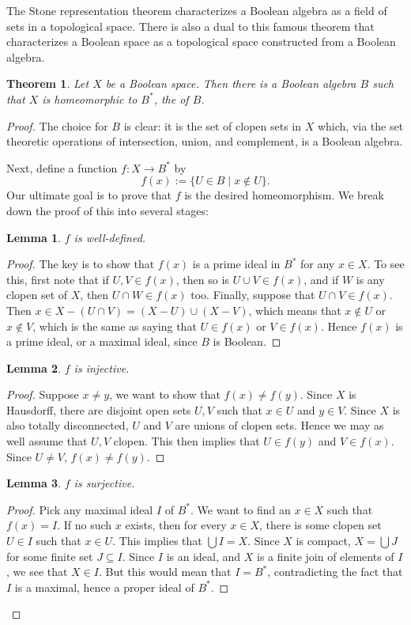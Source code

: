 \documentclass[12pt]{article}
\newtheorem{thm}{Theorem}
\newtheorem{lem}{Lemma}
\begin{document}
The Stone representation theorem characterizes a Boolean algebra as a field of sets in a topological space.  There is also a dual to this famous theorem that characterizes a Boolean space as a topological space constructed from a Boolean algebra.

\begin{thm} Let $X$ be a Boolean space.  Then there is a Boolean algebra $B$ such that $X$ is homeomorphic to $B^*$, the  of $B$. \end{thm}

\begin{proof}
The choice for $B$ is clear: it is the set of clopen sets in $X$ which, via the set theoretic operations of intersection, union, and complement, is a Boolean algebra.  

Next, define a function $f:X \to B^*$ by $$f(x):=\lbrace U \in B \mid x\notin U\rbrace.$$
Our ultimate goal is to prove that $f$ is the desired homeomorphism.  We break down the proof of this into several stages:

\begin{lem} $f$ is well-defined. \end{lem}
\begin{proof} The key is to show that $f(x)$ is a prime ideal in $B^*$ for any $x\in X$.  To see this, first note that if $U,V\in f(x)$, then so is $U\cup V \in f(x)$, and if $W$ is any clopen set of $X$, then $U\cap W\in f(x)$ too.  Finally, suppose that $U\cap V\in f(x)$.  Then $x\in X-(U\cap V)=(X-U)\cup (X-V)$, which means that $x\notin U$ or $x\notin V$, which is the same as saying that $U\in f(x)$ or $V\in f(x)$.  Hence $f(x)$ is a prime ideal, or a maximal ideal, since $B$ is Boolean.  \end{proof}

\begin{lem} $f$ is injective. \end{lem}
\begin{proof} Suppose $x\ne y$, we want to show that $f(x)\ne f(y)$.  Since $X$ is Hausdorff, there are disjoint open sets $U,V$ such that $x\in U$ and $y\in V$.  Since $X$ is also totally disconnected, $U$ and $V$ are unions of clopen sets.  Hence we may as well assume that $U,V$ clopen.  This then implies that $U\in f(y)$ and $V\in f(x)$.  Since $U\ne V$, $f(x)\ne f(y)$.  \end{proof}

\begin{lem} $f$ is surjective. \end{lem}
\begin{proof} Pick any maximal ideal $I$ of $B^*$.  We want to find an $x\in X$ such that $f(x)=I$.  If no such $x$ exists, then for every $x\in X$, there is some clopen set $U\in I$ such that $x\in U$.  This implies that $\bigcup I = X$.  Since $X$ is compact, $X=\bigcup J$ for some finite set $J\subseteq I$.  Since $I$ is an ideal, and $X$ is a finite join of elements of $I$, we see that $X\in I$.  But this would mean that $I=B^*$, contradicting the fact that $I$ is a maximal, hence a proper ideal of $B^*$.  \end{proof}


\end{proof}
\end{document}
